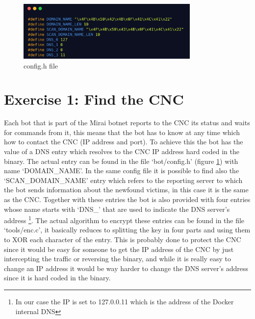 \begin{figure}
    \centering
    \includegraphics[width=0.8\textwidth]{resources/images/config.png}
    \caption{config.h file}
    \label{fig:config_h}
\end{figure}
\section{Exercise 1: Find the CNC}
\label{section:ex1}
Each bot that is part of the Mirai botnet reports to the CNC its status and waits for commands from it, this means that the bot has to know at any time which how to contact the CNC (IP address and port). To achieve this the bot has the value of a DNS entry which resolves to the CNC IP address hard coded in the binary. The actual entry can be found in the file `bot/config.h' (figure \ref{fig:config_h}) with name `DOMAIN\_NAME'. In the same config file it is possible to find also the `SCAN\_DOMAIN\_NAME' entry which refers to the reporting server to which the bot sends information about the newfound victims, in this case it is the same as the CNC. Together with these entries the bot is also provided with four entries whose name starts with `DNS\_' that are used to indicate the DNS server's address \footnote{In our case the IP is set to 127.0.0.11 which is the address of the Docker internal DNS}. The actual algorithm to encrypt these entries can be found in the file `tools/enc.c', it basically reduces to splitting the key in four parts and using them to XOR each character of the entry. This is probably done to protect the CNC since it would be easy for someone to get the IP address of the CNC by just intercepting the traffic or reversing the binary, and while it is really easy to change an IP address it would be way harder to change the DNS server's address since it is hard coded in the binary.

